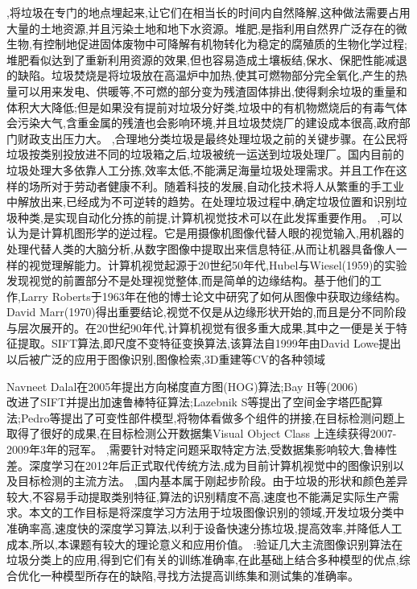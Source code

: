 \documentclass[12pt, a4paper, oneside]{ctexart}
\begin{document}
,将垃圾在专门的地点埋起来,让它们在相当长的时间内自然降解,这种做法需要占用大量的土地资源,并且污染土地和地下水资源。堆肥,是指利用自然界广泛存在的微生物,有控制地促进固体废物中可降解有机物转化为稳定的腐殖质的生物化学过程;堆肥看似达到了重新利用资源的效果,但也容易造成土壤板结,保水、保肥性能减退的缺陷。垃圾焚烧是将垃圾放在高温炉中加热,使其可燃物部分完全氧化,产生的热量可以用来发电、供暖等,不可燃的部分变为残渣固体排出,使得剩余垃圾的重量和体积大大降低;但是如果没有提前对垃圾分好类,垃圾中的有机物燃烧后的有毒气体会污染大气,含重金属的残渣也会影响环境,并且垃圾焚烧厂的建设成本很高,政府部门财政支出压力大。
,合理地分类垃圾是最终处理垃圾之前的关键步骤。在公民将垃圾按类别投放进不同的垃圾箱之后,垃圾被统一运送到垃圾处理厂。国内目前的垃圾处理大多依靠人工分拣,效率太低,不能满足海量垃圾处理需求。并且工作在这样的场所对于劳动者健康不利。随着科技的发展,自动化技术将人从繁重的手工业中解放出来,已经成为不可逆转的趋势。在处理垃圾过程中,确定垃圾位置和识别垃圾种类,是实现自动化分拣的前提,计算机视觉技术可以在此发挥重要作用。
,可以认为是计算机图形学的逆过程。它是用摄像机图像代替人眼的视觉输入,用机器的处理代替人类的大脑分析,从数字图像中提取出来信息特征,从而让机器具备像人一样的视觉理解能力。计算机视觉起源于20世纪50年代,Hubel与Wiesel(1959)的实验发现视觉的前置部分不是处理视觉整体,而是简单的边缘结构。基于他们的工作,Larry Roberts于1963年在他的博士论文中研究了如何从图像中获取边缘结构。David Marr(1970)得出重要结论,视觉不仅是从边缘形状开始的,而且是分不同阶段与层次展开的。在20世纪90年代,计算机视觉有很多重大成果,其中之一便是关于特征提取。SIFT算法,即尺度不变特征变换算法,该算法自1999年由David Lowe提出以后被广泛的应用于图像识别,图像检索,3D重建等CV的各种领域
\par Navneet Dalal在2005年提出方向梯度直方图(HOG)算法;Bay H等(2006)\\改进了SIFT并提出加速鲁棒特征算法;Lazebnik S等提出了空间金字塔匹配算法;Pedro等提出了可变性部件模型,将物体看做多个组件的拼接,在目标检测问题上取得了很好的成果,在目标检测公开数据集Visual Object Class 上连续获得2007-2009年3年的冠军。
,需要针对特定问题采取特定方法,受数据集影响较大,鲁棒性差。深度学习在2012年后正式取代传统方法,成为目前计算机视觉中的图像识别以及目标检测的主流方法。
,国内基本属于刚起步阶段。由于垃圾的形状和颜色差异较大,不容易手动提取类别特征,算法的识别精度不高,速度也不能满足实际生产需求。本文的工作目标是将深度学习方法用于垃圾图像识别的领域,开发垃圾分类中准确率高,速度快的深度学习算法,以利于设备快速分拣垃圾,提高效率,并降低人工成本,所以,本课题有较大的理论意义和应用价值。
:验证几大主流图像识别算法在垃圾分类上的应用,得到它们有关的训练准确率,在此基础上结合多种模型的优点,综合优化一种模型所存在的缺陷,寻找方法提高训练集和测试集的准确率。
\newpage
\end{document}
